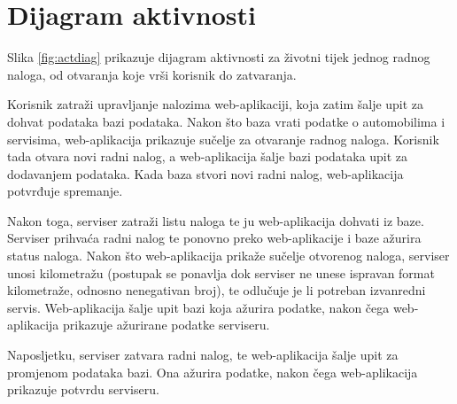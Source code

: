 			\eject 
			
%			
%			
		
		\section{Dijagram aktivnosti}
			
			Slika \ref{fig:actdiag} prikazuje dijagram aktivnosti za životni tijek jednog radnog naloga, od otvaranja koje vrši korisnik do zatvaranja.
			
			Korisnik zatraži upravljanje nalozima web-aplikaciji, koja zatim šalje upit za dohvat podataka bazi podataka. Nakon što baza vrati podatke o automobilima i servisima, web-aplikacija prikazuje sučelje za otvaranje radnog naloga. Korisnik tada otvara novi radni nalog, a web-aplikacija šalje bazi podataka upit za dodavanjem podataka. Kada baza stvori novi radni nalog, web-aplikacija potvrđuje spremanje. 
			
			Nakon toga, serviser zatraži listu naloga te ju web-aplikacija dohvati iz baze. Serviser prihvaća radni nalog te ponovno preko web-aplikacije i baze ažurira status naloga. Nakon što web-aplikacija prikaže sučelje otvorenog naloga, serviser unosi kilometražu (postupak se ponavlja dok serviser ne unese ispravan format kilometraže, odnosno nenegativan broj), te odlučuje je li potreban izvanredni servis. Web-aplikacija šalje upit bazi koja ažurira podatke, nakon čega web-aplikacija prikazuje ažurirane podatke serviseru. 
			
			Naposljetku, serviser zatvara radni nalog, te web-aplikacija šalje upit za promjenom podataka bazi. Ona ažurira podatke, nakon čega web-aplikacija prikazuje potvrdu serviseru.
			 
